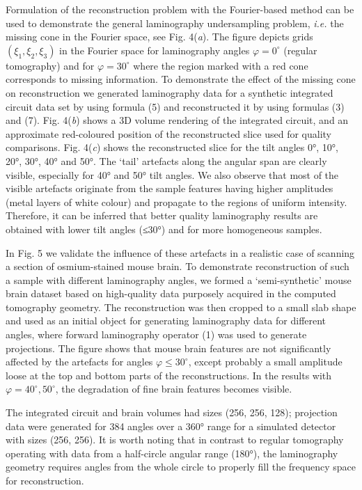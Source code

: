\documentclass{article}
\begin{document}
Formulation of the reconstruction problem with the Fourier-based method can be used to demonstrate the general laminography undersampling problem, \emph{i.e.} the missing cone in the Fourier space, see Fig. 4(\emph{a}). The figure depicts grids $(\xi_1, \xi_2, \xi_3)$ in the Fourier space for laminography angles $\varphi = 0^\circ$ (regular tomography) and for $\varphi = 30^\circ$ where the region marked with a red cone corresponds to missing information. To demonstrate the effect of the missing cone on reconstruction we generated laminography data for a synthetic integrated circuit data set by using formula (5) and reconstructed it by using formulas (3) and (7). Fig. 4(\emph{b}) shows a 3D volume rendering of the integrated circuit, and an approximate red-coloured position of the reconstructed slice used for quality comparisons. Fig. 4(\emph{c}) shows the reconstructed slice for the tilt angles 0°, 10°, 20°, 30°, 40° and 50°. The ‘tail’ artefacts along the angular span are clearly visible, especially for 40° and 50° tilt angles. We also observe that most of the visible artefacts originate from the sample features having higher amplitudes (metal layers of white colour) and propagate to the regions of uniform intensity. Therefore, it can be inferred that better quality laminography results are obtained with lower tilt angles (≤30°) and for more homogeneous samples.

In Fig. 5 we validate the influence of these artefacts in a realistic case of scanning a section of osmium-stained mouse brain. To demonstrate reconstruction of such a sample with different laminography angles, we formed a ‘semi-synthetic’ mouse brain dataset based on high-quality data purposely acquired in the computed tomography geometry. The reconstruction was then cropped to a small slab shape and used as an initial object for generating laminography data for different angles, where forward laminography operator (1) was used to generate projections. The figure shows that mouse brain features are not significantly affected by the artefacts for angles $\varphi \leq 30^\circ$, except probably a small amplitude loose at the top and bottom parts of the reconstructions. In the results with $\varphi = 40^\circ, 50^\circ$, the degradation of fine brain features becomes visible.

The integrated circuit and brain volumes had sizes (256, 256, 128); projection data were generated for 384 angles over a 360° range for a simulated detector with sizes (256, 256). It is worth noting that in contrast to regular tomography operating with data from a half-circle angular range (180°), the laminography geometry requires angles from the whole circle to properly fill the frequency space for reconstruction.
\end{document}
